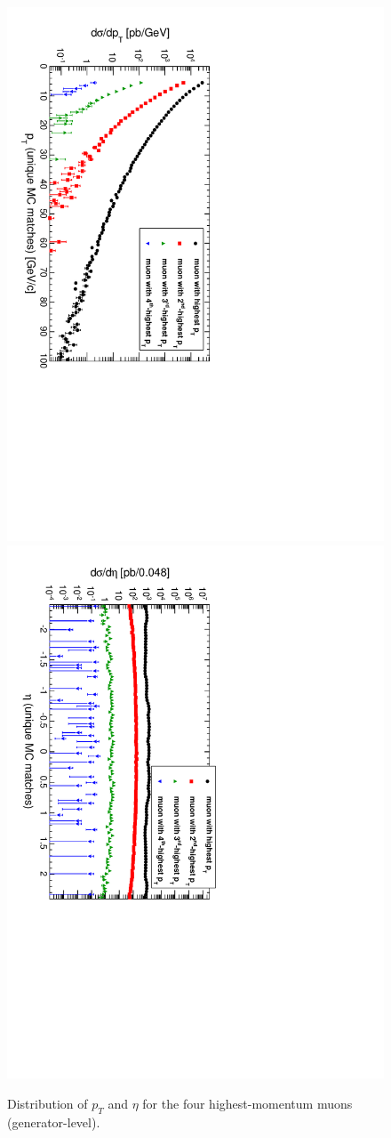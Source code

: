 \documentclass[12pt]{article}
\begin{document}
\begin{figure}
\includegraphics[height=0.5\linewidth, angle=90]{fig/backgroundsMatching_plot/ptcurves_real.pdf}
\includegraphics[height=0.5\linewidth, angle=90]{fig/backgroundsMatching_plot/etacurves_real.pdf}

\caption{Distribution of $p_T$ and $\eta$ for the four highest-momentum muons (generator-level). \label{fig:curves_real}}
\end{figure}
\end{document}
